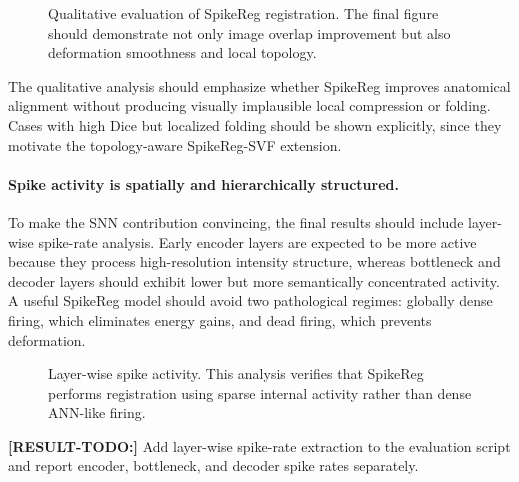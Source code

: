 \begin{figure}[t]
\centering
{}
\caption{
Qualitative evaluation of SpikeReg registration. 
The final figure should demonstrate not only image overlap improvement but also deformation smoothness and local topology.
}
\label{fig:qualitative}
\end{figure}

The qualitative analysis should emphasize whether SpikeReg improves anatomical alignment without producing visually implausible local compression or folding. Cases with high Dice but localized folding should be shown explicitly, since they motivate the topology-aware SpikeReg-SVF extension.


\paragraph{Spike activity is spatially and hierarchically structured.}
To make the SNN contribution convincing, the final results should include layer-wise spike-rate analysis. Early encoder layers are expected to be more active because they process high-resolution intensity structure, whereas bottleneck and decoder layers should exhibit lower but more semantically concentrated activity. A useful SpikeReg model should avoid two pathological regimes: globally dense firing, which eliminates energy gains, and dead firing, which prevents deformation.

\begin{figure}[t]
\centering
{}
\caption{
Layer-wise spike activity. 
This analysis verifies that SpikeReg performs registration using sparse internal activity rather than dense ANN-like firing.
}
\label{fig:spike_layers}
\end{figure}

\textbf{[RESULT-TODO:]} Add layer-wise spike-rate extraction to the evaluation script and report encoder, bottleneck, and decoder spike rates separately.

